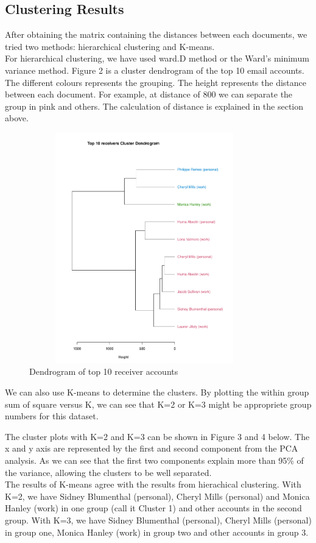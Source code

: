 \documentclass[11pt,a4paper]{article}
\begin{document}
\newpage
\subsection*{Clustering Results}
After obtaining the matrix containing the distances between each documents, we tried two methods: hierarchical clustering and K-means. 
\\
For hierarchical clustering, we have used ward.D method or the Ward's minimum variance method. Figure 2 is a cluster dendrogram of the top 10 email accounts. The different colours represents the grouping. The height represents the distance between each document. For example, at distance of 800 we can separate the group in pink and others. The calculation of distance is explained in the section above.
\begin{figure}[h!]
    \centering
    \includegraphics[width=10cm,height=10cm]
    {clusterp.pdf}
    \caption{Dendrogram of top 10 receiver accounts}
\end{figure}

We can also use K-means to determine the clusters. By plotting the within group sum of square versus K, we can see that K=2 or K=3 might be appropriete group numbers for this dataset.

The cluster plots with K=2 and K=3 can be shown in Figure 3 and 4 below. The x and y axis are represented by the first and second component from the PCA analysis. As we can see that the first two components explain more than 95\% of the variance, allowing the clusters to be well separated. 
\\
The results of K-means agree with the results from hierachical clustering. With K=2, we have Sidney Blumenthal (personal), Cheryl Mills (personal) and Monica Hanley (work) in one group (call it Cluster 1) and other accounts in the second group. With K=3, we have Sidney Blumenthal (personal), Cheryl Mills (personal) in group one, Monica Hanley (work) in group two and other accounts in group 3.
\end{document}
